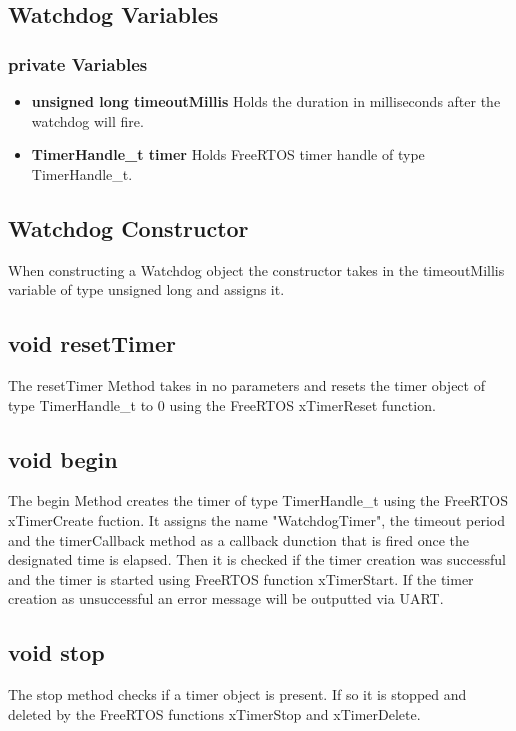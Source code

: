 \subsection{Watchdog Variables}
\label{subsec:Watchdog_Variables}

\subsubsection{private Variables}
\begin{itemize}
	\item \textbf{unsigned long timeoutMillis}
	\newline
	Holds the duration in milliseconds after the watchdog will fire. 
	\item \textbf{TimerHandle\_t timer}
	\newline
	Holds FreeRTOS timer handle of type TimerHandle\_t. 
\end{itemize}

\subsection{Watchdog Constructor}
\label{subsec:Watchdog_Constructor}
When constructing a Watchdog object the constructor takes in the timeoutMillis variable of type unsigned long and assigns it. 

\subsection{void resetTimer}
\label{subsec:Watchdog_resetTimer}
The resetTimer Method takes in no parameters and resets the timer object of type TimerHandle\_t to 0 using the FreeRTOS xTimerReset function. 

\subsection{void begin}
\label{subsec:Watchdog_begin}
The begin Method creates the timer of type TimerHandle\_t using the FreeRTOS xTimerCreate fuction. 
It assigns the name "WatchdogTimer", the timeout period and the timerCallback method as a callback dunction that is fired once the designated time is elapsed. 
Then it is checked if the timer creation was successful and the timer is started using FreeRTOS function xTimerStart. 
If the timer creation as unsuccessful an error message will be outputted via UART. 

\subsection{void stop}
\label{subsec:Watchdog_stop}
The stop method checks if a timer object is present. 
If so it is stopped and deleted by the FreeRTOS functions xTimerStop and xTimerDelete. 

